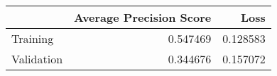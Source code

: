 \begin{tabular}{lrr}
\toprule
{} &  Average Precision Score &      Loss \\
\midrule
Training   &                 0.547469 &  0.128583 \\
Validation &                 0.344676 &  0.157072 \\
\bottomrule
\end{tabular}
